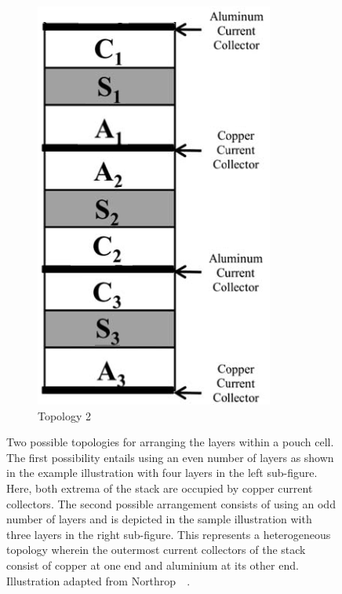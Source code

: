 \begin{figure}[!htbp]
\begin{subfigure}[b]{0.225\textwidth}
        \includegraphics[width=\linewidth]{chapters/layer_opt/figures/layer_stack}
        \caption{Topology 2}
        \label{fig:topology2}
    \end{subfigure}
    \caption[Two possible topologies for arranging the layers within a pouch
    cell]
    {Two possible topologies for arranging the layers within a pouch cell. The
        first possibility entails using an even number of layers as shown in the
        example illustration with four layers in the left sub-figure. Here, both
        extrema of the stack are occupied by copper current collectors. The
        second possible arrangement consists of using an odd number of layers
        and  is depicted in the  sample illustration with three layers in
        the right sub-figure. This represents a heterogeneous topology wherein
        the outermost current collectors of the stack consist of copper at one
        end and aluminium at its other end. Illustration adapted from
    Northrop~\etal~\cite{Northrop2011}.}
    \label{fig:topologies}
\end{figure}

